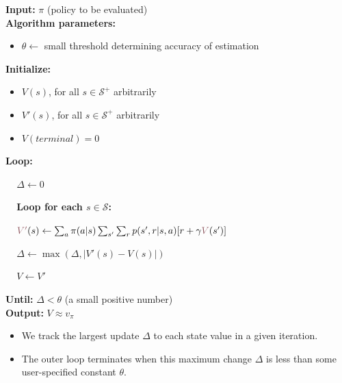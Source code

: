 \documentclass[12pt, a4paper]{article}
\begin{document}
\begin{tcolorbox}[title={Iterative Policy Evaluation, for estimating $V \approx v_\pi$}]

  \textbf{Input:} $\pi$ (policy to be evaluated) \\

  \textbf{Algorithm parameters:}
  \begin{itemize}
    \item $\theta \leftarrow$ small threshold determining accuracy of estimation
  \end{itemize}

  \textbf{Initialize:}
  \begin{itemize}
    \item $V(s)$, for all $s \in \mathcal{S}^+$ arbitrarily
    \item $V'(s)$, for all $s \in \mathcal{S}^+$ arbitrarily
    \item $V(terminal) = 0$
  \end{itemize}


  \textbf{Loop:}
  \begin{description}
      \item $\;\;\;$ $\Delta \leftarrow 0$
      \item $\;\;\;$ \textbf{Loop for each $s \in \mathcal{S}$:}
      \begin{description}
        \item $\;\;\;$ $\textcolor[HTML]{8F5760}{V'}(s) \leftarrow \sum_a \pi(a|s) \sum_{s'} \sum_{r} p(s',r|s,a) [r + \gamma \textcolor[HTML]{8F5760}{V} (s')]$
        \item $\;\;\;$ $\Delta \leftarrow \max (\Delta , | V'(s) - V(s) |)$
      \end{description}
      \item $\;\;\;$ $V \leftarrow V'$
  \end{description}
  \textbf{Until:} $\Delta < \theta$ (a small positive number) \\

  \textbf{Output:} $V \approx v_\pi$
\end{tcolorbox}

\begin{itemize}
  \item We track the largest update $\Delta$ to each state value in a given iteration.
  \item The outer loop terminates when this maximum change $\Delta$ is less than some user-specified constant $\theta$.
\end{itemize}
\end{document}
